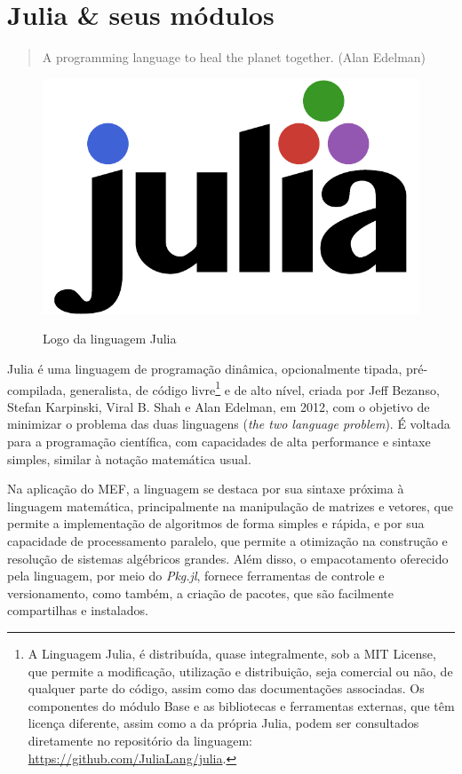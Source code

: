 \chapter{Julia \& seus módulos} 
\label{ch:julia}

\begin{quotation}
    A programming language to heal the planet together.
    (Alan Edelman)
\end{quotation}

\begin{figure}[hbtp]
    \centering
    \caption{Logo da linguagem Julia}
    \includegraphics[scale = 0.6]{Figuras/julia-logo-color.pdf}
    \label{fig:julia-logo}
\end{figure}

Julia é uma linguagem de programação dinâmica, opcionalmente tipada, pré-compilada, generalista, de código livre\footnote{A Linguagem Julia, é distribuída, quase integralmente, sob a MIT License, que permite a modificação, utilização e distribuição, seja comercial ou não, de qualquer parte do código, assim como das documentações associadas. Os componentes do módulo Base e as bibliotecas e ferramentas externas, que têm licença diferente, assim como a da própria Julia, podem ser consultados diretamente no repositório da linguagem: \url{https://github.com/JuliaLang/julia}.} e de alto nível, criada por Jeff Bezanso, Stefan Karpinski, Viral B. Shah e Alan Edelman, em 2012, com o objetivo de minimizar o problema das duas linguagens (\emph{the two language problem}). É voltada para a programação científica, com capacidades de alta performance e sintaxe simples, similar à notação matemática usual. \cite{Sherrington}

Na aplicação do MEF, a linguagem se destaca por sua sintaxe próxima à linguagem matemática, principalmente na manipulação de matrizes e vetores, que permite a implementação de algoritmos de forma simples e rápida, e por sua capacidade de processamento paralelo, que permite a otimização na construção e resolução de sistemas algébricos grandes. Além disso, o empacotamento oferecido pela linguagem, por meio do \emph{Pkg.jl}, fornece ferramentas de controle e versionamento, como também, a criação de pacotes, que são facilmente compartilhas e instalados.

